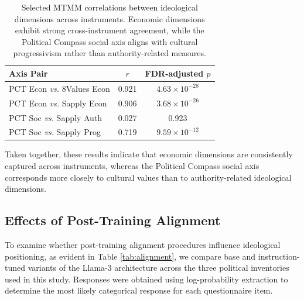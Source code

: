 \documentclass[11pt]{article}
\begin{document}
\begin{table}[t]
\centering
\small
\begin{tabular}{p{3.5cm} c c}
\toprule
\textbf{Axis Pair} & \textbf{$r$} & \textbf{FDR-adjusted $p$} \\
\midrule
PCT Econ \textit{vs.} 8Values Econ & 0.921 & $4.63 \times 10^{-28}$ \\
PCT Econ \textit{vs.} Sapply Econ & 0.906 & $3.68 \times 10^{-26}$ \\
PCT Soc \textit{vs.} Sapply Auth & 0.027 & 0.923 \\
PCT Soc \textit{vs.} Sapply Prog & 0.719 & $9.59 \times 10^{-12}$ \\
\bottomrule
\end{tabular}
\caption{Selected MTMM correlations between ideological dimensions across instruments. Economic dimensions exhibit strong cross-instrument agreement, while the Political Compass social axis aligns with cultural progressivism rather than authority-related measures.}
\label{tab:mtmm}
\end{table}

Taken together, these results indicate that economic dimensions are consistently captured across instruments, whereas the Political Compass social axis corresponds more closely to cultural values than to authority-related ideological dimensions.

\subsection{Effects of Post-Training Alignment}

To examine whether post-training alignment procedures influence ideological positioning, as evident in Table \ref{tab:alignment}, we compare base and instruction-tuned variants of the Llama-3 architecture across the three political inventories used in this study. Responses were obtained using log-probability extraction to determine the most likely categorical response for each questionnaire item.
\end{document}
